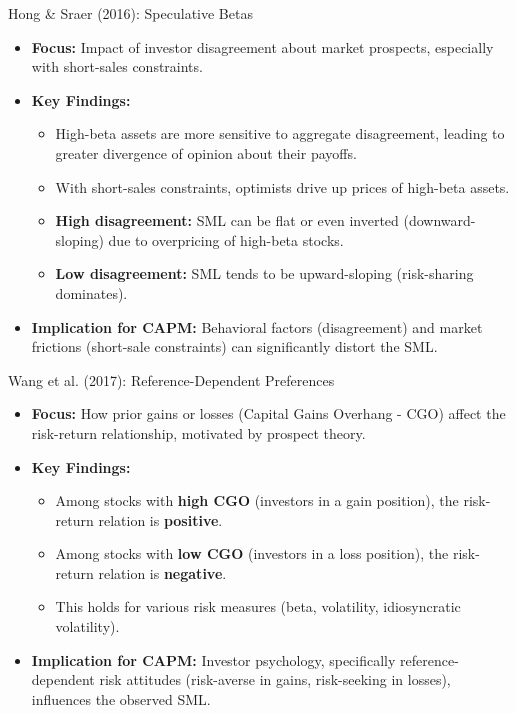 \documentclass[10pt]{beamer}
\begin{document}
\begin{frame}{Hong \& Sraer (2016): Speculative Betas}

  \begin{itemize}
    \item \textbf{Focus:} Impact of investor disagreement about market prospects, especially with short-sales constraints.
    \item \textbf{Key Findings:}
    \begin{itemize}
        \item High-beta assets are more sensitive to aggregate disagreement, leading to greater divergence of opinion about their payoffs.
        \item With short-sales constraints, optimists drive up prices of high-beta assets.
        \item \textbf{High disagreement:} SML can be flat or even inverted (downward-sloping) due to overpricing of high-beta stocks.
        \item \textbf{Low disagreement:} SML tends to be upward-sloping (risk-sharing dominates).
    \end{itemize}
    \item \textbf{Implication for CAPM:} Behavioral factors (disagreement) and market frictions (short-sale constraints) can significantly distort the SML.
  \end{itemize}
\end{frame}

\begin{frame}{Wang et al. (2017): Reference-Dependent Preferences}
  \begin{itemize}
    \item \textbf{Focus:} How prior gains or losses (Capital Gains Overhang - CGO) affect the risk-return relationship, motivated by prospect theory.
    \item \textbf{Key Findings:}
    \begin{itemize}
        \item Among stocks with \textbf{high CGO} (investors in a gain position), the risk-return relation is \textbf{positive}.
        \item Among stocks with \textbf{low CGO} (investors in a loss position), the risk-return relation is \textbf{negative}.
        \item This holds for various risk measures (beta, volatility, idiosyncratic volatility).
    \end{itemize}
    \item \textbf{Implication for CAPM:} Investor psychology, specifically reference-dependent risk attitudes (risk-averse in gains, risk-seeking in losses), influences the observed SML.
  \end{itemize}
\end{frame}
\end{document}
